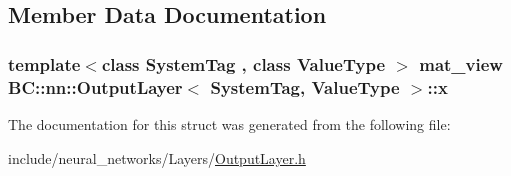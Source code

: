\subsection{Member Data Documentation}
\subsubsection[{\texorpdfstring{x}{x}}]{\setlength{\rightskip}{0pt plus 5cm}template$<$class System\+Tag , class Value\+Type $>$ {\bf mat\+\_\+view} {\bf B\+C\+::nn\+::\+Output\+Layer}$<$ System\+Tag, Value\+Type $>$\+::x}\hypertarget{structBC_1_1nn_1_1OutputLayer_ae0a078b2729e63488341170aed4099e6}{}\label{structBC_1_1nn_1_1OutputLayer_ae0a078b2729e63488341170aed4099e6}


The documentation for this struct was generated from the following file\+:\begin{DoxyCompactItemize}
\item 
include/neural\+\_\+networks/\+Layers/\hyperlink{OutputLayer_8h}{Output\+Layer.\+h}\end{DoxyCompactItemize}
